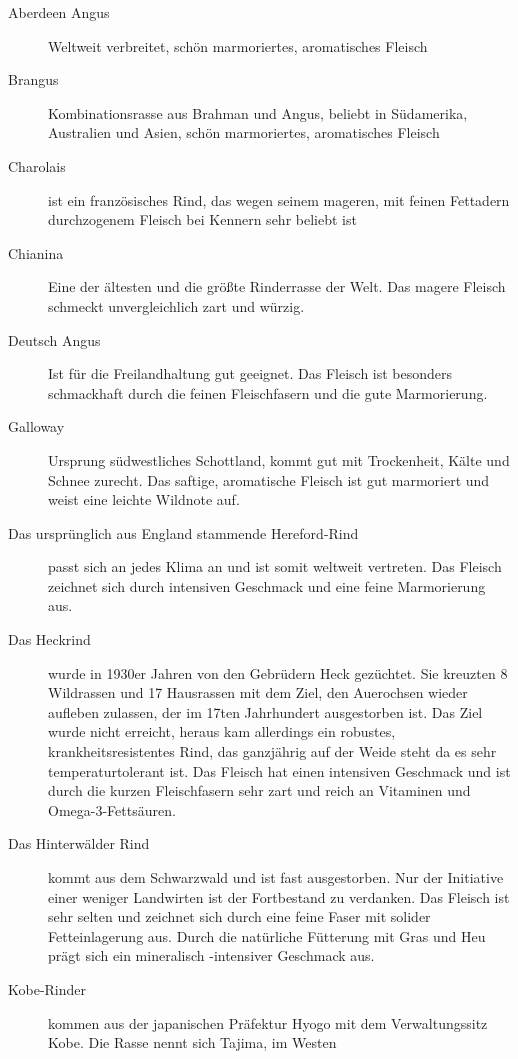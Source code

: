 \begin{description}
	\item[Aberdeen Angus] Weltweit verbreitet, schön marmoriertes, 
	aromatisches Fleisch
	\item[Brangus] Kombinationsrasse aus Brahman und Angus, beliebt in 
	Südamerika, Australien und Asien, schön marmoriertes, aromatisches 
	Fleisch
	\item[Charolais] ist ein französisches Rind, das wegen seinem 
	mageren, mit feinen Fettadern durchzogenem Fleisch bei Kennern sehr 
	beliebt ist
	\item[Chianina] Eine der ältesten und die größte Rinderrasse der Welt. 
	Das magere Fleisch schmeckt unvergleichlich zart und würzig.
	\item[Deutsch Angus] Ist für die Freilandhaltung gut geeignet. Das 
	Fleisch ist besonders schmackhaft durch die feinen Fleischfasern und 
	die gute Marmorierung.
	\item[Galloway] Ursprung südwestliches Schottland, kommt gut mit 
	Trockenheit, Kälte und Schnee zurecht. Das saftige, aromatische 
	Fleisch ist gut marmoriert und weist eine leichte Wildnote auf.
	\item [Das ursprünglich aus England stammende Hereford-Rind] passt 
	sich an jedes Klima an und ist somit weltweit vertreten. Das Fleisch 
	zeichnet sich durch intensiven Geschmack und eine feine Marmorierung 
	aus.
	\item [Das Heckrind] wurde in 1930er Jahren von den Gebrüdern Heck 
	gezüchtet. Sie kreuzten 8 Wildrassen und 17 Hausrassen mit dem Ziel, den 
	Auerochsen wieder aufleben zulassen, der im 17ten Jahrhundert 
	ausgestorben ist. Das Ziel wurde nicht erreicht, heraus kam allerdings ein 
	robustes, krankheitsresistentes Rind, das ganzjährig auf der Weide steht da 
	es sehr temperaturtolerant ist. Das Fleisch hat einen intensiven Geschmack 
	und ist durch die kurzen Fleischfasern sehr zart und reich an Vitaminen und 
	Omega-3-Fettsäuren.
	\item[Das Hinterwälder Rind] kommt aus dem Schwarzwald und ist fast 
	ausgestorben. Nur der Initiative einer weniger Landwirten ist der 
	Fortbestand zu verdanken. Das Fleisch ist sehr selten und zeichnet 
	sich durch eine feine Faser mit solider Fetteinlagerung aus. Durch die 
	natürliche Fütterung mit Gras und Heu prägt sich ein mineralisch 
	-intensiver Geschmack aus.
	\item[Kobe-Rinder] kommen aus der japanischen Präfektur Hyogo mit 
	dem Verwaltungssitz Kobe. Die Rasse nennt sich Tajima, im Westen 

\end{description}
